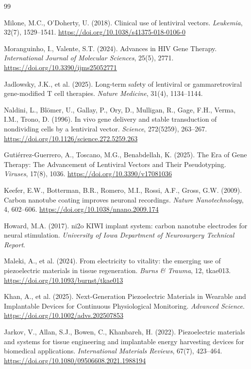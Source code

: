 \documentclass[12pt]{article}
\begin{document}
\begin{thebibliography}{99}

Milone, M.C., O'Doherty, U. (2018).
Clinical use of lentiviral vectors.
\textit{Leukemia}, 32(7), 1529--1541.
\url{https://doi.org/10.1038/s41375-018-0106-0}

Moranguinho, I., Valente, S.T. (2024).
Advances in HIV Gene Therapy.
\textit{International Journal of Molecular Sciences}, 25(5), 2771.
\url{https://doi.org/10.3390/ijms25052771}

Jadlowsky, J.K., et al. (2025).
Long-term safety of lentiviral or gammaretroviral gene-modified T cell therapies.
\textit{Nature Medicine}, 31(4), 1134--1144.

Naldini, L., Bl\"{o}mer, U., Gallay, P., Ory, D., Mulligan, R., Gage, F.H., Verma, I.M., Trono, D. (1996).
In vivo gene delivery and stable transduction of nondividing cells by a lentiviral vector.
\textit{Science}, 272(5259), 263--267.
\url{https://doi.org/10.1126/science.272.5259.263}

Guti\'{e}rrez-Guerrero, A., Toscano, M.G., Benabdellah, K. (2025).
The Era of Gene Therapy: The Advancement of Lentiviral Vectors and Their Pseudotyping.
\textit{Viruses}, 17(8), 1036.
\url{https://doi.org/10.3390/v17081036}

Keefer, E.W., Botterman, B.R., Romero, M.I., Rossi, A.F., Gross, G.W. (2009).
Carbon nanotube coating improves neuronal recordings.
\textit{Nature Nanotechnology}, 4, 602--606.
\url{https://doi.org/10.1038/nnano.2009.174}

Howard, M.A. (2017).
ni2o KIWI implant system: carbon nanotube electrodes for neural stimulation.
\textit{University of Iowa Department of Neurosurgery Technical Report}.

Maleki, A., et al. (2024).
From electricity to vitality: the emerging use of piezoelectric materials in tissue regeneration.
\textit{Burns \& Trauma}, 12, tkae013.
\url{https://doi.org/10.1093/burnst/tkae013}

Khan, A., et al. (2025).
Next-Generation Piezoelectric Materials in Wearable and Implantable Devices for Continuous Physiological Monitoring.
\textit{Advanced Science}.
\url{https://doi.org/10.1002/advs.202507853}

Jarkov, V., Allan, S.J., Bowen, C., Khanbareh, H. (2022).
Piezoelectric materials and systems for tissue engineering and implantable energy harvesting devices for biomedical applications.
\textit{International Materials Reviews}, 67(7), 423--464.
\url{https://doi.org/10.1080/09506608.2021.1988194}


\end{thebibliography}
\end{document}
